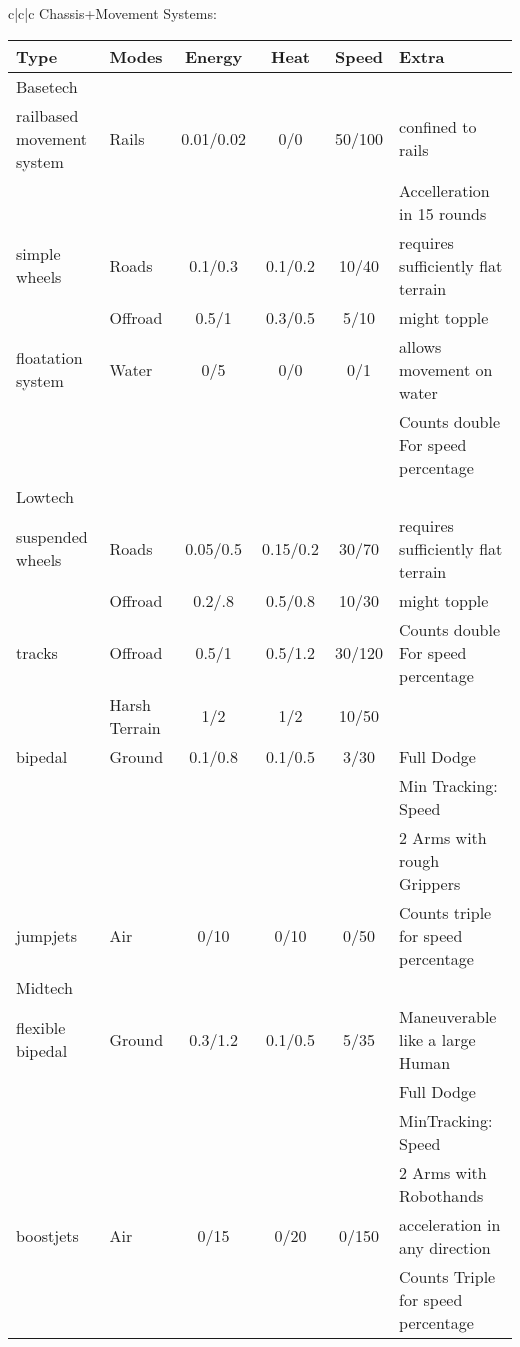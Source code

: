 \documentclass{article}
\begin{document}
\begin{tabular}{c|c|c}
    Chassis+Movement Systems:\\
    \begin{tabular}{l|lcccl}
        Type    &Modes &Energy &Heat &Speed &Extra\\
        \hline
        Basetech\\
        railbased movement system & Rails &0.01/0.02&0/0&50/100& confined to rails\\
        &&&&&Accelleration in 15 rounds\\
        simple wheels           & Roads &0.1/0.3 &0.1/0.2& 10/40 & requires sufficiently flat terrain \\
        & Offroad&0.5/1&0.3/0.5& 5/10 & might topple\\
        floatation system         & Water & 0/5  &  0/0  & 0/1   & allows movement on water\\
        &       &     &       &       & Counts double For speed percentage\\
        \hline
        Lowtech\\
        suspended wheels          & Roads &0.05/0.5 &0.15/0.2& 30/70 & requires sufficiently flat terrain \\
        & Offroad&0.2/.8&0.5/0.8& 10/30 & might topple\\
        tracks                    & Offroad&0.5/1&0.5/1.2& 30/120 &Counts double For speed percentage\\
        & Harsh Terrain&1/2&1/2& 10/50 &\\
        bipedal                   & Ground &0.1/0.8&0.1/0.5& 3/30 & Full Dodge\\
        &&&&&Min Tracking: Speed\\
        &&&&&2 Arms with rough Grippers\\
        jumpjets                  & Air &0/10&0/10&0/50& Counts triple for speed percentage\\
        \hline
        Midtech\\
        flexible bipedal          & Ground &0.3/1.2&0.1/0.5 & 5/35 & Maneuverable like a large Human\\
        &&&&&Full Dodge\\
        &&&&&MinTracking: Speed\\
        &&&&&2 Arms with Robothands\\
        boostjets                 & Air &0/15 &0/20&0/150& acceleration in any direction\\
        &&&&&Counts Triple for speed percentage\\

\end{tabular}
\end{tabular}
\end{document}
